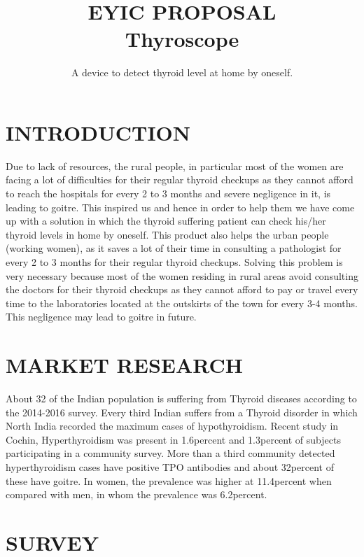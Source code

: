 \documentclass[a4paper,12pt]{article}
\begin{document}
	\title{EYIC PROPOSAL \\Thyroscope}
	\author{A device to detect thyroid level at home by oneself.}
	\maketitle

	\newpage
	\doublespacing
	\tableofcontents

	
	\newpage
	\section{INTRODUCTION}
	Due to lack of resources, the rural people, in particular most of the women are facing a lot of difficulties for their regular thyroid checkups as they cannot afford to reach the hospitals for every 2 to 3 months and severe negligence in it, is leading to goitre. 
	This inspired us and hence in order to help them we have come up with a solution in which the thyroid suffering patient can check his/her thyroid levels in home by oneself. This product also helps the urban people (working women), as it saves a lot of their time in consulting a pathologist for every 2 to 3 months for their regular thyroid checkups.
	Solving this problem is very necessary because most of the women residing in rural areas avoid consulting the doctors for their thyroid checkups as they cannot afford to pay or travel every time to the laboratories located at the outskirts of the town for every 3-4 months. This negligence may lead to goitre in future.
	
	\newpage
	\section{MARKET RESEARCH}
	About 32 of the Indian population is suffering from Thyroid diseases according to the 2014-2016 survey.
	Every third Indian suffers from a Thyroid disorder in which North India recorded the maximum cases of hypothyroidism.
	Recent study in Cochin, Hyperthyroidism was present in 1.6percent and 1.3percent of subjects participating in a community survey.
	More than a third community detected hyperthyroidism cases have positive TPO antibodies and about 32percent of these have goitre.
	In women, the prevalence was higher at 11.4percent when compared with men, in whom the prevalence was 6.2percent.
	
	\newpage
    \section{SURVEY}
    
\end{document}
